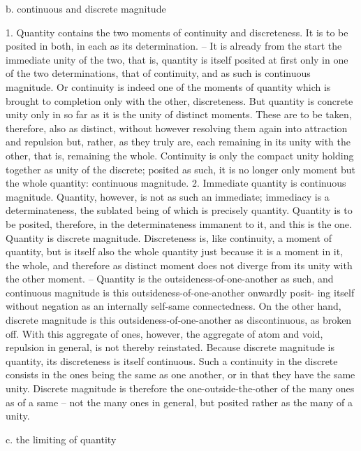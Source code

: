 b. continuous and discrete magnitude

1. Quantity contains the two moments of continuity and discreteness. It
is to be posited in both, in each as its determination. – It is already from
the start the immediate unity of the two, that is, quantity is itself posited at
first only in one of the two determinations, that of continuity, and as such
is continuous magnitude.
Or continuity is indeed one of the moments of quantity which is brought
to completion only with the other, discreteness. But quantity is concrete
unity only in so far as it is the unity of distinct moments. These are to
be taken, therefore, also as distinct, without however resolving them again
into attraction and repulsion but, rather, as they truly are, each remaining
in its unity with the other, that is, remaining the whole. Continuity is only
the compact unity holding together as unity of the discrete; posited as such,
it is no longer only moment but the whole quantity: continuous magnitude.
2. Immediate quantity is continuous magnitude. Quantity, however, is
not as such an immediate; immediacy is a determinateness, the sublated
being of which is precisely quantity. Quantity is to be posited, therefore,
in the determinateness immanent to it, and this is the one. Quantity is
discrete magnitude.
Discreteness is, like continuity, a moment of quantity, but is itself also
the whole quantity just because it is a moment in it, the whole, and
therefore as distinct moment does not diverge from its unity with the
other moment. – Quantity is the outsideness-of-one-another as such, and
continuous magnitude is this outsideness-of-one-another onwardly posit-
ing itself without negation as an internally self-same connectedness. On
the other hand, discrete magnitude is this outsideness-of-one-another as
discontinuous, as broken off. With this aggregate of ones, however, the
aggregate of atom and void, repulsion in general, is not thereby reinstated.
Because discrete magnitude is quantity, its discreteness is itself continuous.
Such a continuity in the discrete consists in the ones being the same as
one another, or in that they have the same unity. Discrete magnitude is
therefore the one-outside-the-other of the many ones as of a same – not the
many ones in general, but posited rather as the many of a unity.

c. the limiting of quantity

